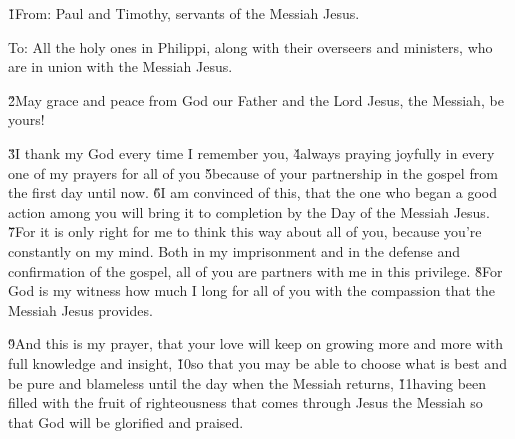 


\v{1}From: Paul and Timothy, servants of the Messiah Jesus.

To: All the holy ones in Philippi, along with their overseers and ministers, who are in union with the Messiah Jesus.

\v{2}May grace and peace from God our Father and the Lord Jesus, the Messiah, be yours!

\v{3}I thank my God every time I remember you, \v{4}always praying joyfully in every one of my prayers for all of you \v{5}because of your partnership in the gospel from the first day until now. \v{6}I am convinced of this, that the one who began a good action among you will bring it to completion by the Day of the Messiah Jesus. \v{7}For it is only right for me to think this way about all of you, because you're constantly on my mind. Both in my imprisonment and in the defense and confirmation of the gospel, all of you are partners with me in this privilege. \v{8}For God is my witness how much I long for all of you with the compassion that the Messiah Jesus provides.

\v{9}And this is my prayer, that your love will keep on growing more and more with full knowledge and insight, \v{10}so that you may be able to choose what is best and be pure and blameless until the day when the Messiah returns, \v{11}having been filled with the fruit of righteousness that comes through Jesus the Messiah so that God will be glorified and praised.

